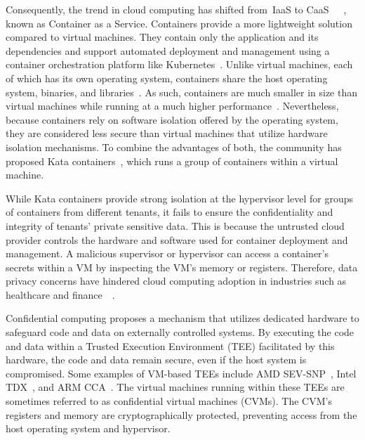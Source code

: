 Consequently, the trend in cloud computing has shifted from~\acrshort{IaaS} to CaaS~\cite*{Azure_container}~\cite*{Amazon_container}~\cite*{google_container}, known as Container as a Service. Containers provide a more lightweight solution compared to virtual machines. They contain only the application and its dependencies and support automated deployment and management using a 
container orchestration platform like Kubernetes~\cite*{k8s}. Unlike virtual machines, each of which has its own operating system, containers share the host operating system, binaries, and libraries~\cite*{container_vs_vm}. As such, containers are much smaller in size than virtual machines while running at a much higher performance~\cite*{Shirinbab2020PerformanceEO}. 
Nevertheless, because containers rely on software isolation offered by the operating system, they are considered less secure than virtual machines that utilize hardware isolation mechanisms. To combine the advantages of both, the community has proposed Kata containers~\cite*{Kata-Containers}, which 
runs a group of containers within a virtual machine.
 
While Kata containers provide strong isolation at the hypervisor level for groups of containers from different tenants, it fails to ensure the confidentiality and integrity of tenants' private sensitive data. This is because the untrusted cloud provider controls the hardware and software used for 
container deployment and management. A malicious supervisor or hypervisor can access a container's secrets within a VM by inspecting the VM's memory or registers. Therefore, data privacy concerns have hindered cloud computing adoption in industries such as healthcare and finance~\cite*{data_privacy}~\cite*{eu_data_Privacy}.
 
Confidential computing proposes a mechanism that utilizes dedicated hardware to safeguard code and data on externally controlled systems. By executing the code and data within a Trusted Execution Environment (TEE) facilitated by this hardware, the code and data remain secure, even if the host system is compromised. Some examples of VM-based \acrshort{TEE}s include 
AMD SEV-SNP~\cite*{SEV_SNP_white_book}, Intel TDX~\cite*{Intel_tdx_whitepaper}, and ARM CCA~\cite*{280904}. The virtual machines running within these \acrshort{TEE}s are sometimes referred to as confidential virtual machines (CVMs). The \acrshort{CVM}'s registers and memory are 
cryptographically protected, preventing access from the host operating system and hypervisor.
 
 
 

